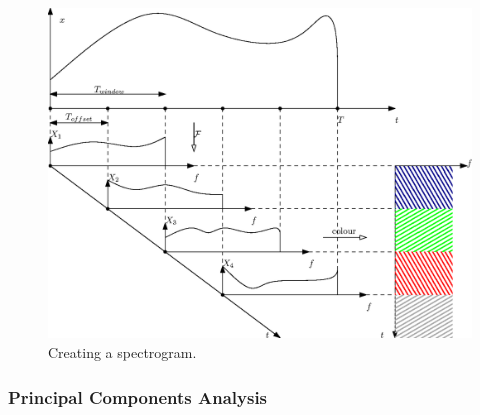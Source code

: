 \begin{figure}[h!]
	\centering
		\includegraphics{drawings/spec.eps}
	\caption{Creating a spectrogram.}
	\label{fig:spec}
\end{figure}

\subsubsection{Principal Components Analysis}
